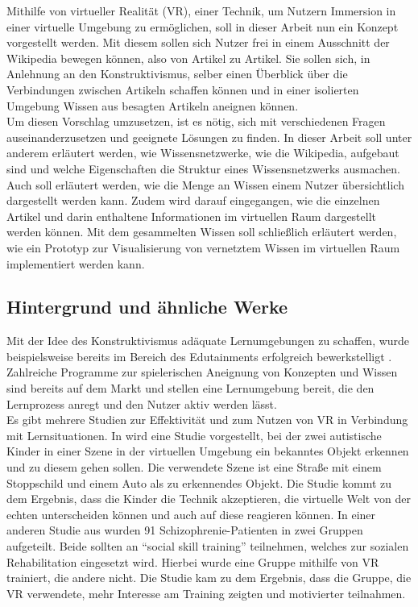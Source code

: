 \documentclass[12pt, a4paper]{article}
\begin{document}
Mithilfe von virtueller Realität (VR), einer Technik, um Nutzern Immersion in einer virtuelle Umgebung zu ermöglichen, soll in dieser Arbeit nun ein Konzept vorgestellt werden. Mit diesem sollen sich Nutzer frei in einem Ausschnitt der Wikipedia bewegen können, also von Artikel zu Artikel. Sie sollen sich, in Anlehnung an den Konstruktivismus, selber einen Überblick über die Verbindungen zwischen Artikeln schaffen können und in einer isolierten Umgebung Wissen aus besagten Artikeln aneignen können.\\

Um diesen Vorschlag umzusetzen, ist es nötig, sich mit verschiedenen Fragen auseinanderzusetzen und geeignete Lösungen zu finden. In dieser Arbeit soll unter anderem erläutert werden, wie Wissensnetzwerke, wie die Wikipedia, aufgebaut sind und welche Eigenschaften die Struktur eines Wissensnetzwerks ausmachen. Auch soll erläutert werden, wie die Menge an Wissen einem Nutzer übersichtlich dargestellt werden kann. Zudem wird darauf eingegangen, wie die einzelnen Artikel und darin enthaltene Informationen im virtuellen Raum dargestellt werden können. Mit dem gesammelten Wissen soll schließlich erläutert werden, wie ein Prototyp zur Visualisierung von vernetztem Wissen im virtuellen Raum implementiert werden kann.\\

\subsection{Hintergrund und ähnliche Werke}
Mit der Idee des Konstruktivismus adäquate Lernumgebungen zu schaffen, wurde beispielsweise bereits im Bereich des Edutainments erfolgreich bewerkstelligt \cite{bertacchini2012motivating}. Zahlreiche Programme zur spielerischen Aneignung von Konzepten und Wissen sind bereits auf dem Markt und stellen eine Lernumgebung bereit, die den Lernprozess anregt und den Nutzer aktiv werden lässt.\\

Es gibt mehrere Studien zur Effektivität und zum Nutzen von VR in Verbindung mit Lernsituationen. In  wird eine Studie vorgestellt, bei der zwei autistische Kinder in einer Szene in der virtuellen Umgebung ein bekanntes Objekt erkennen und zu diesem gehen sollen. Die verwendete Szene ist eine Straße mit einem Stoppschild und einem Auto als zu erkennendes Objekt. Die Studie kommt zu dem Ergebnis, dass die Kinder die Technik akzeptieren, die virtuelle Welt von der echten unterscheiden können und auch auf diese reagieren können. In einer anderen Studie aus  wurden 91 Schizophrenie-Patienten in zwei Gruppen aufgeteilt. Beide sollten an "`social skill training"' teilnehmen, welches zur sozialen Rehabilitation eingesetzt wird. Hierbei wurde eine Gruppe mithilfe von VR trainiert, die andere nicht. Die Studie kam zu dem Ergebnis, dass die Gruppe, die VR verwendete, mehr Interesse am Training zeigten und motivierter teilnahmen.\\
\end{document}
